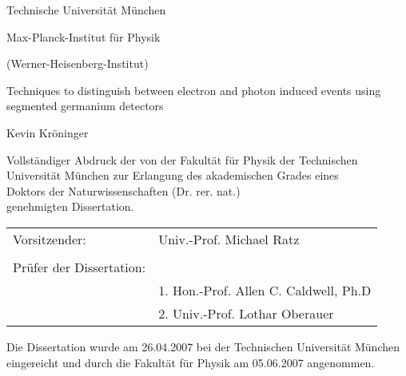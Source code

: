 \begin{titlepage}

\centering

\vspace{1.0cm}

\begin{center}

{\Huge Technische Universit\"at M\"unchen}

\vspace{1.5 cm}

{\Large Max-Planck-Institut f\"ur Physik \\}

\vspace{0.5 cm} 

{\Large (Werner-Heisenberg-Institut)} 

\vspace{1.5 cm}

{\Large Techniques to distinguish between electron and photon induced
events using segmented germanium detectors}

\vspace{1.5 cm}

{\Large Kevin Kr\"oninger\\}

\end{center} 

\vspace{1.5 cm}

\begin{center}
Vollst\"andiger Abdruck der von der Fakult\"at f\"ur Physik der
Technischen Universit\"at M\"unchen zur Erlangung des akademischen
Grades eines \\Doktors der Naturwissenschaften (Dr. rer. nat.) \\ 
genehmigten Dissertation. \\
\end{center}

\vspace{1.5 cm} 

\begin{table*}[h]
\center
\begin{tabular}{ll}
Vorsitzender: & \phantom{1.} Univ.-Prof. Michael Ratz\\ 
& \\ 
Pr\"ufer der Dissertation: & \\ 
& 1. Hon.-Prof. Allen C. Caldwell, Ph.D \\ 
& 2. Univ.-Prof. Lothar Oberauer \\ 
\end{tabular}
\end{table*}

\vspace{2.0 cm} 

\begin{center}
Die Dissertation wurde am 26.04.2007 bei der Technischen Universit\"at
M\"unchen eingereicht und durch die Fakult\"at f\"ur Physik am
05.06.2007 angenommen. \\
\end{center}

\end{titlepage} 


